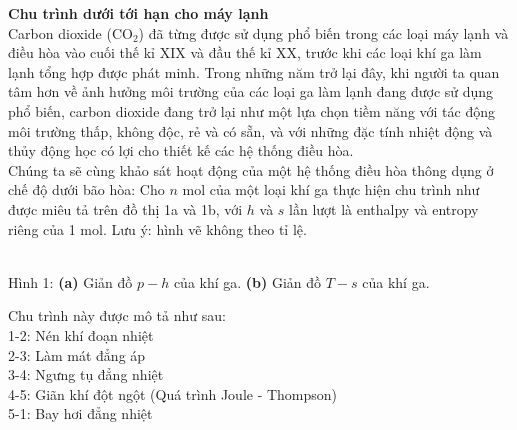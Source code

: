\textbf{Chu trình dưới tới hạn cho máy lạnh}\\

Carbon dioxide (\(\mathrm{CO}_2\)) đã từng được sử dụng phổ biến trong các loại máy lạnh và điều hòa vào cuối thế kỉ XIX và đầu thế kỉ XX, trước khi các loại khí ga làm lạnh tổng hợp được phát minh. Trong những năm trở lại đây, khi người ta quan tâm hơn về ảnh hưởng môi trường của các loại ga làm lạnh đang được sử dụng phổ biến, carbon dioxide đang trở lại như một lựa chọn tiềm năng với tác động môi trường thấp, không độc, rẻ và có sẵn, và với những đặc tính nhiệt động và thủy động học có lợi cho thiết kế các hệ thống điều hòa. \\

Chúng ta sẽ cùng khảo sát hoạt động của một hệ thống điều hòa thông dụng ở chế độ dưới bão hòa: Cho \(n\) mol của một loại khí ga thực hiện chu trình như được miêu tả trên đồ thị 1a và 1b, với \(h\) và \(s\) lần lượt là enthalpy và entropy riêng của 1 mol. Lưu ý: hình vẽ không theo tỉ lệ. \\

\begin{center}
     \\
Hình 1: \textbf{(a)} Giản đồ $p-h$ của khí ga. \textbf{(b)} Giản đồ $T-s$ của khí ga.
\end{center}
Chu trình này được mô tả như sau: \\
1-2: Nén khí đoạn nhiệt \\
2-3: Làm mát đẳng áp \\
3-4: Ngưng tụ đẳng nhiệt \\
4-5: Giãn khí đột ngột (Quá trình Joule - Thompson) \\
5-1: Bay hơi đẳng nhiệt \\

